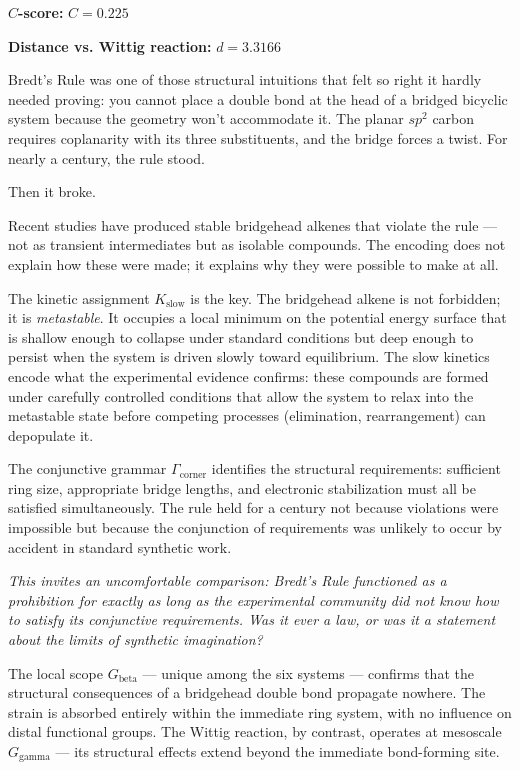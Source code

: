 \documentclass[12pt,a4paper]{article}
\begin{document}
\textbf{$C$-score:} $C = 0.225$

\textbf{Distance vs. Wittig reaction:} $d = 3.3166$

Bredt's Rule was one of those structural intuitions that felt so right it hardly needed proving: you cannot place a double bond at the head of a bridged bicyclic system because the geometry won't accommodate it. The planar $sp^2$ carbon requires coplanarity with its three substituents, and the bridge forces a twist. For nearly a century, the rule stood.

Then it broke.

Recent studies have produced stable bridgehead alkenes that violate the rule --- not as transient intermediates but as isolable compounds. The encoding does not explain how these were made; it explains why they were possible to make at all.

The kinetic assignment $K_\textrm{slow}$ is the key. The bridgehead alkene is not forbidden; it is \emph{metastable}. It occupies a local minimum on the potential energy surface that is shallow enough to collapse under standard conditions but deep enough to persist when the system is driven slowly toward equilibrium. The slow kinetics encode what the experimental evidence confirms: these compounds are formed under carefully controlled conditions that allow the system to relax into the metastable state before competing processes (elimination, rearrangement) can depopulate it.

The conjunctive grammar $\Gamma_{\text{corner}}$ identifies the structural requirements: sufficient ring size, appropriate bridge lengths, and electronic stabilization must all be satisfied simultaneously. The rule held for a century not because violations were impossible but because the conjunction of requirements was unlikely to occur by accident in standard synthetic work.

\emph{This invites an uncomfortable comparison: Bredt's Rule functioned as a prohibition for exactly as long as the experimental community did not know how to satisfy its conjunctive requirements. Was it ever a law, or was it a statement about the limits of synthetic imagination?}

The local scope $G_{\text{beta}}$ --- unique among the six systems --- confirms that the structural consequences of a bridgehead double bond propagate nowhere. The strain is absorbed entirely within the immediate ring system, with no influence on distal functional groups. The Wittig reaction, by contrast, operates at mesoscale $G_{\text{gamma}}$ --- its structural effects extend beyond the immediate bond-forming site.
\end{document}
